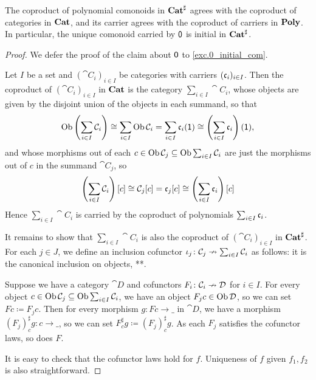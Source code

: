 \documentclass[Book-Poly]{subfiles}
\begin{document}
\begin{proposition}
The coproduct of polynomial comonoids in $\mathbf{Cat}^\sharp$ agrees with the coproduct of categories in $\mathbf{Cat}$, and its carrier agrees with the coproduct of carriers in $\mathbf{Poly}$.
In particular, the unique comonoid carried by $\textsf{0}$ is initial in $\mathbf{Cat}^\sharp$.
\end{proposition}
\begin{proof}
We defer the proof of the claim about $\textsf{0}$ to \cref{exc.0_initial_com}.

Let $I$ be a set and $(\cat{C}_i)_{i\in I}$ be categories with carriers $(\mathfrak{c}_i)_{i\in I}$.
Then the coproduct of $(\cat{C}_i)_{i\in I}$ in $\mathbf{Cat}$ is the category $\sum_{i\in I}\cat{C}_i$, whose objects are given by the disjoint union of the objects in each summand, so that
\[
    \operatorname{Ob}\left(\sum_{i\in I}\mathcal{C}_i\right)\cong\sum_{i\in I}\operatorname{Ob}\mathcal{C}_i=\sum_{i\in I}\mathfrak{c}_i(\textsf{1})\cong\left(\sum_{i\in I}\mathfrak{c}_i\right)(\textsf{1}),
\]
and whose morphisms out of each $c\in\operatorname{Ob}\mathcal{C}_j\subseteq\operatorname{Ob}\sum_{i\in I}\mathcal{C}_i$ are just the morphisms out of $c$ in the summand $\cat{C}_j$, so
\[
    \left(\sum_{i\in I}\mathcal{C}_i\right)[c]\cong\mathcal{C}_j[c]=\mathfrak{c}_j[c]\cong\left(\sum_{i\in I}\mathfrak{c}_i\right)[c]
\]
Hence $\sum_{i\in I}\cat{C}_i$ is carried by the coproduct of polynomials $\sum_{i\in I}\mathfrak{c}_i$.


It remains to show that $\sum_{i\in I}\cat{C}_i$ is also the coproduct of $(\cat{C}_i)_{i\in I}$ in $\mathbf{Cat}^\sharp$.
For each $j\in J$, we define an inclusion cofunctor $\iota_j\colon\mathcal{C}_j\nrightarrow\sum_{i\in I}\mathcal{C}_i$ as follows: it is the canonical inclusion on objects, **. %

Suppose we have a category $\cat{D}$ and cofunctors $F_i\colon\mathcal{C}_i\nrightarrow\mathcal{D}$ for $i\in I$.
For every object $c\in\operatorname{Ob}\mathcal{C}_j\subseteq\operatorname{Ob}\sum_{i\in I}\mathcal{C}_i$, we have an object $F_j c\in\operatorname{Ob}\mathcal{D}$, so we can set $Fc\coloneqq F_j c$.
Then for every morphism $g\colon Fc\to\_$ in $\cat{D}$, we have a morphism $\left(F_j\right)^\sharp_c g\colon c\to\_$, so we can set $F^\sharp_c g\coloneqq\left(F_j\right)^\sharp_c g$.
As each $F_j$ satisfies the cofunctor laws, so does $F$.



It is easy to check that the cofunctor laws hold for $f$. Uniqueness of $f$ given $f_1,f_2$ is also straightforward.
\end{proof}
\end{document}
